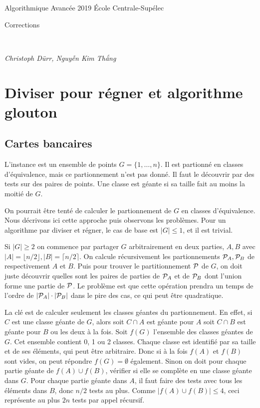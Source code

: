 \documentclass[12pt]{article}
\newcommand{\MakeScribeTop}[1]{
\noindent
\begin{framed}
\noindent
 Algorithmique Avancée 2019
 \hfill
 École Centrale-Supélec
 \\[1em]
 \centerline{ \Large
#1
 }
 \\[1em]
\centerline{  \it Christoph Dürr, Nguyễn Kim Thắng}
\end{framed}
}
\begin{document}
    \MakeScribeTop{Corrections}

\section{Diviser pour régner et algorithme glouton}

\subsection{Cartes bancaires}

    L'instance est un ensemble de points $G=\{1,\ldots,n\}$. Il est partionné
en classes d'équivalence, mais ce partionnement n'est pas donné. Il faut le
découvrir par des tests sur des paires de points. Une classe est géante si sa
taille fait au moins la moitié de $G$.

On pourrait être tenté de calculer le partionnement de $G$ en classes d'équivalence.
Nous décrivons ici cette approche puis observons les problèmes.  
Pour un algorithme par diviser et régner, le cas de base est $|G|\leq 1$, et il est trivial.

Si $|G|\geq2$ on commence par partager $G$ arbitrairement en deux parties,
$A,B$ avec  $|A|=\lfloor n/2 \rfloor, |B|=\lceil n/2 \rceil$. On calcule
récursivement les partionnements ${\cal P}_A,{\cal P}_B$ de respectivement $A$
et $B$.  Puis pour trouver le partitionnement $\cal P$ de $G$, on doit juste
découvrir quelles sont les paires de parties de ${\cal P}_A$ et de ${\cal P}_B$
dont l'union forme une partie de $\cal P$.  Le problème est que cette
opération prendra un temps de l'ordre de $|{\cal P}_A| \cdot |{\cal P}_B|$
dans le pire des cas, ce qui peut être quadratique.

La clé est de calculer seulement les classes géantes du partionnement.  En
effet, si $C$ est une classe géante de $G$, alors soit $C\cap A$ est géante
pour $A$ soit $C\cap B$ est géante pour $B$ ou les deux à la fois.   Soit
$f(G)$ l'ensemble des classes géantes de $G$. Cet ensemble contient 0, 1 ou 2
classes. Chaque classe est identifié par sa taille et de ses éléments, qui
peut être arbitraire. Donc si à la fois $f(A)$ et $f(B)$ sont vides, on peut
répondre $f(G)=\emptyset$ également. Sinon on doit pour chaque partie géante
de $f(A)\cup f(B)$, vérifier si elle se complète en une classe géante dans
$G$.  Pour chaque partie géante dans $A$, il faut faire des tests avec tous
les éléments dans $B$, donc $n/2$ tests au plus. Comme $|f(A)\cup f(B)|\leq
4$, ceci représente au plus $2n$ tests par appel récursif.
\end{document}
